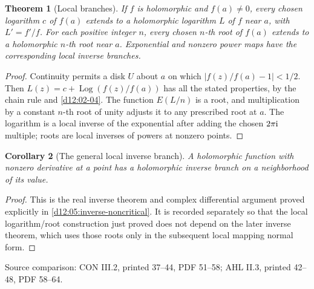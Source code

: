 \documentclass[11pt,a4paper,openany]{book}
\newtheorem{theorem}{Theorem}[chapter]
\newtheorem{corollary}[theorem]{Corollary}
\theoremstyle{definition}
\theoremstyle{remark}\newtheorem{remark}[theorem]{Remark}
\newcommand{\family}[1]{}
\newcommand{\source}[1]{\par\begingroup\small\sffamily\color{black!65}Source comparison: #1\par\endgroup}
\begin{document}
\begin{theorem}[Local branches]\family{D12.02.05}\label{d12:02-05}
If \(f\) is holomorphic and \(f(a)\ne0\), every chosen logarithm \(c\) of
\(f(a)\) extends to a holomorphic logarithm \(L\) of \(f\) near \(a\), with
\(L'=f'/f\). For each positive integer \(n\), every chosen \(n\)-th root
of \(f(a)\) extends to a holomorphic \(n\)-th root near \(a\).
Exponential and nonzero power maps have the corresponding local inverse
branches.
\end{theorem}
\begin{proof}
Continuity permits a disk \(U\) about \(a\) on which
\(|f(z)/f(a)-1|<1/2\). Then
\(L(z)=c+\operatorname{Log}(f(z)/f(a))\) has all the stated properties,
by the chain rule and \cref{d12:02-04}.
The function \(E(L/n)\) is a root, and multiplication by a constant
\(n\)-th root of unity adjusts it to any prescribed root at \(a\).
The logarithm is a local inverse of the exponential after adding the
chosen \(2\pi\mathrm i\) multiple; roots are local inverses of powers at
nonzero points.
\end{proof}
\begin{corollary}[The general local inverse branch]\label{d12:02-05-inverse}
A holomorphic function with nonzero derivative at a point has a
holomorphic inverse branch on a neighborhood of its value.
\end{corollary}
\begin{proof}
This is the real inverse theorem and complex differential argument
proved explicitly in \cref{d12:05:inverse-noncritical}. It is recorded
separately so that the local logarithm/root construction just proved
does not depend on the later inverse theorem, which uses those roots
only in the subsequent local mapping normal form.
\end{proof}
\source{CON III.2, printed 37--44, PDF 51--58; AHL II.3, printed 42--48, PDF 58--64.}
\end{document}
